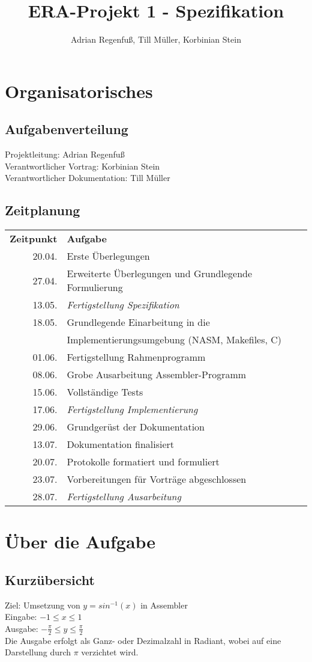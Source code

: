 \documentclass{article}
\title{ERA-Projekt 1 - Spezifikation}
\author{Adrian Regenfuß, Till Müller, Korbinian Stein}
\begin{document}
\maketitle
\section{Organisatorisches}
	\subsection{Aufgabenverteilung}
		Projektleitung: Adrian Regenfuß\\
		Verantwortlicher Vortrag: Korbinian Stein\\
		Verantwortlicher Dokumentation: Till Müller
	\subsection{Zeitplanung}
		\begin{tabular}{r | l}
			\textbf{Zeitpunkt}&\textbf{Aufgabe}\\
			20.04.&Erste Überlegungen\\
			27.04.&Erweiterte Überlegungen und Grundlegende Formulierung\\
			13.05.&\emph{Fertigstellung Spezifikation}\\
			18.05.&Grundlegende Einarbeitung in die\\
					  &Implementierungsumgebung (NASM, Makefiles, C)\\
			01.06.&Fertigstellung Rahmenprogramm\\
			08.06.&Grobe Ausarbeitung Assembler-Programm\\
			15.06.&Vollständige Tests\\
			17.06.&\emph{Fertigstellung Implementierung}\\
			29.06.&Grundgerüst der Dokumentation\\
			13.07.&Dokumentation finalisiert\\
			20.07.&Protokolle formatiert und formuliert\\
			23.07.&Vorbereitungen für Vorträge abgeschlossen\\
			28.07.&\emph{Fertigstellung Ausarbeitung}\\
		\end{tabular}

\section{Über die Aufgabe}
	\subsection{Kurzübersicht}
		Ziel: Umsetzung von $y = sin^{-1}(x)$ in Assembler\\
		Eingabe: $-1 \leq x \leq 1$\\
		Ausgabe: $-\frac{\pi}{2} \leq y \leq \frac{\pi}{2}$\\
		Die Ausgabe erfolgt als Ganz- oder Dezimalzahl in Radiant, wobei auf eine Darstellung durch $\pi$ verzichtet wird.
\end{document}
